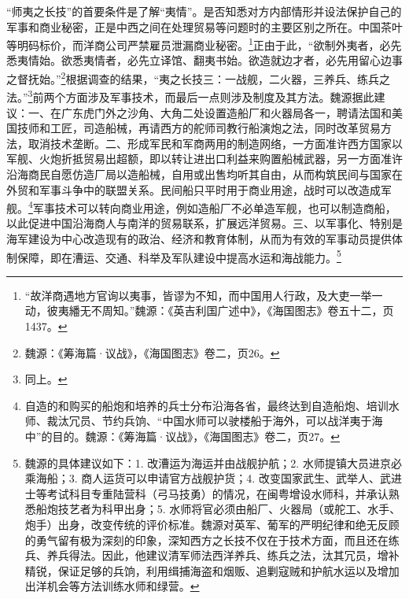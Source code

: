 \documentclass[a4paper, 12pt, openright]{ctexbook}
\begin{document}
“师夷之长技”的首要条件是了解“夷情”。是否知悉对方内部情形并设法保护自己的军事和商业秘密，正是中西之间在处理贸易等问题时的主要区别之所在。中国茶叶等明码标价，而洋商公司严禁雇员泄漏商业秘密。\footnote{“故洋商遇地方官询以夷事，皆谬为不知，而中国用人行政，及大吏一举一动，彼夷繙无不周知。”魏源：《英吉利国广述中》，《海国图志》卷五十二，页1437。}正由于此，“欲制外夷者，必先悉夷情始。欲悉夷情者，必先立译馆、翻夷书始。欲造就边才者，必先用留心边事之督抚始。”\footnote{魏源：《筹海篇·议战》，《海国图志》卷二，页26。}根据调查的结果，“夷之长技三：一战舰，二火器，三养兵、练兵之法。”\footnote{同上。}前两个方面涉及军事技术，而最后一点则涉及制度及其方法。魏源据此建议：一、在广东虎门外之沙角、大角二处设置造船厂和火器局各一，聘请法国和美国技师和工匠，司造船械，再请西方的舵师司教行船演炮之法，同时改革贸易方法，取消技术垄断。二、形成军民和军商两用的制造网络，一方面准许西方国家以军舰、火炮折抵贸易出超额，即以转让进出口利益来购置船械武器，另一方面准许沿海商民自愿仿造厂局以造船械，自用或出售均听其自由，从而构筑民间与国家在外贸和军事斗争中的联盟关系。民间船只平时用于商业用途，战时可以改造成军舰。\footnote{自造的和购买的船炮和培养的兵士分布沿海各省，最终达到自造船炮、培训水师、裁汰冗员、节约兵饷、“中国水师可以驶楼船于海外，可以战洋夷于海中”的目的。魏源：《筹海篇·议战》，《海国图志》卷二，页27。}军事技术可以转向商业用途，例如造船厂不必单造军舰，也可以制造商船，以此促进中国沿海商人与南洋的贸易联系，扩展远洋贸易。三、以军事化、特别是海军建设为中心改造现有的政治、经济和教育体制，从而为有效的军事动员提供体制保障，即在漕运、交通、科举及军队建设中提高水运和海战能力。\footnote{魏源的具体建议如下：1. 改漕运为海运并由战舰护航；2. 水师提镇大员进京必乘海船；3. 商人运货可以申请官方战舰护货；4. 改变国家武生、武举人、武进士等考试科目专重陆营科（弓马技勇）的情况，在闽粤增设水师科，并承认熟悉船炮技艺者为科甲出身；5. 水师将官必须由船厂、火器局（或舵工、水手、炮手）出身，改变传统的评价标准。魏源对英军、葡军的严明纪律和绝无反顾的勇气留有极为深刻的印象，深知西方之长技不仅在于技术方面，而且还在练兵、养兵得法。因此，他建议清军师法西洋养兵、练兵之法，汰其冗员，增补精锐，保证足够的兵饷，利用缉捕海盗和烟贩、追剿寇贼和护航水运以及增加出洋机会等方法训练水师和绿营。}
\end{document}

